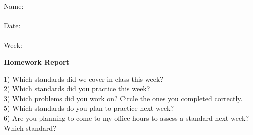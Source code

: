 \documentclass[letterpaper]{article}
\begin{document}
\begin{flushright}
 Name: \underline{\phantom{xxxxxxxxxxxxxxxxxxxxxxxxxxxxxxxxxxxx}}\\
	\ \\
 Date: \underline{\phantom{xxxxxxxxxxxxxxxxxxxxxxxxxxxxxxxxxxxx}}\\
\ \\
Week: \underline{\phantom{xxxxxxxxxxx}}\\
\end{flushright}
\begin{center}
{\Large \bf Homework Report} \\
\large \course
\end{center}


\begin{flushleft}
1) Which standards did we cover in class this week? \\
\vspace{1in}
2) Which standards did you practice this week? \\
\vspace{1in}
3) Which problems did you work on?  Circle the ones you completed correctly. \\
\vspace{2in}
5) Which standards do you plan to practice next week? \\
\vspace{1in}
6) Are you planning to come to my office hours to assess a standard next week?  Which standard? \\
\vspace{1in}
\end{flushleft}
\end{document}
